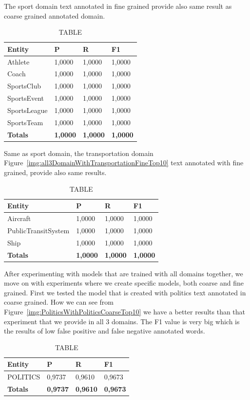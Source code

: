 \documentclass[thesis=M,english]{FITthesis}[2018/05/30]
\begin{document}
	The sport domain text annotated in fine grained provide also same result as coarse grained annotated domain. 
	\begin{table}[H]\centering
		\caption{TABLE}
		\label{}
		\begin{tabular}{|l|l|l|l|}
			\hline {\textbf{Entity}} & {\textbf{P}} & {\textbf{R}} & {\textbf{F1}}\\\hline
				Athlete & 1,0000 & 1,0000 & 1,0000\\
				Coach & 1,0000 & 1,0000 & 1,0000\\
				SportsClub & 1,0000 & 1,0000 & 1,0000\\
				SportsEvent & 1,0000 & 1,0000 & 1,0000\\
				SportsLeague & 1,0000 & 1,0000 & 1,0000\\
				SportsTeam & 1,0000 & 1,0000 & 1,0000\\\hline
				\textbf{Totals} & \textbf{1,0000} & \textbf{1,0000} & \textbf{1,0000}\\\hline
		\end{tabular}
	\end{table}
	
	Same as sport domain, the transportation domain Figure~\ref{img:all3DomainWithTransportationFineTop10} text annotated with fine grained, provide also same results.
	\begin{table}[H]\centering
		\caption{TABLE}
		\label{}
		\begin{tabular}{|l|l|l|l|}
			\hline {\textbf{Entity}} & {\textbf{P}} & {\textbf{R}} & {\textbf{F1}}\\\hline
				Aircraft & 1,0000 & 1,0000 & 1,0000\\
				PublicTransitSystem & 1,0000 & 1,0000 & 1,0000\\
				Ship & 1,0000 & 1,0000 & 1,0000\\\hline
				\textbf{Totals} & \textbf{1,0000} & \textbf{1,0000} & \textbf{1,0000}\\\hline
		\end{tabular}
	\end{table}

	After experimenting with models that are trained with all domains together, we move on with experiments where we create specific models, both coarse and fine grained.
	First we tested the model that is created with politics text annotated in coarse grained. How we can see from Figure~\ref{img:PoliticsWithPoliticsCoarseTop10} we have a better results than that experiment that we provide in all 3 domains. The F1 value is very big which is the results of low false positive and false negative annotated words.        
	\begin{table}[H]\centering
		\caption{TABLE}
		\label{}
		\begin{tabular}{|l|l|l|l|}
			\hline {\textbf{Entity}} & {\textbf{P}} & {\textbf{R}} & {\textbf{F1}}\\\hline
				POLITICS & 0,9737 & 0,9610 & 0,9673\\\hline
				\textbf{Totals} & \textbf{0,9737} & \textbf{0,9610} & \textbf{0,9673}\\\hline
		\end{tabular}
	\end{table}	
\end{document}
